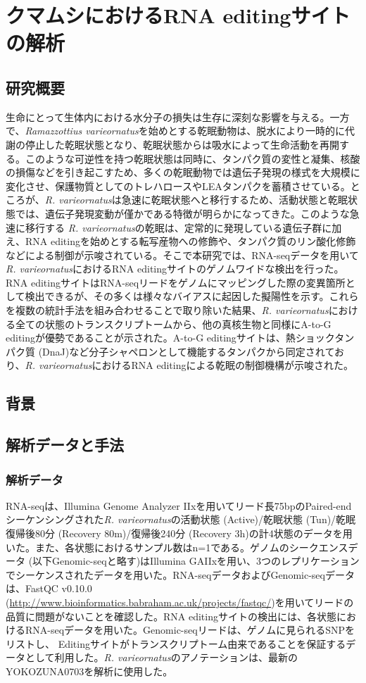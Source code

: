 \chapter{クマムシにおけるRNA editingサイトの解析}

\section{研究概要}
生命にとって生体内における水分子の損失は生存に深刻な影響を与える。一方で、{\it Ramazzottius varieornatus}を始めとする乾眠動物は、脱水により一時的に代謝の停止した乾眠状態となり、乾眠状態からは吸水によって生命活動を再開する。このような可逆性を持つ乾眠状態は同時に、タンパク質の変性と凝集、核酸の損傷などを引き起こすため、多くの乾眠動物では遺伝子発現の様式を大規模に変化させ、保護物質としてのトレハロースやLEAタンパクを蓄積させている。ところが、{\it R. varieornatus}は急速に乾眠状態へと移行するため、活動状態と乾眠状態では、遺伝子発現変動が僅かである特徴が明らかになってきた。このような急速に移行する {\it R. varieornatus}の乾眠は、定常的に発現している遺伝子群に加え、RNA editingを始めとする転写産物への修飾や、タンパク質のリン酸化修飾などによる制御が示唆されている。そこで本研究では、RNA-seqデータを用いて{\it R. varieornatus}におけるRNA editingサイトのゲノムワイドな検出を行った。RNA editingサイトはRNA-seqリードをゲノムにマッピングした際の変異箇所として検出できるが、その多くは様々なバイアスに起因した擬陽性を示す。これらを複数の統計手法を組み合わせることで取り除いた結果、{\it R. varieornatus}における全ての状態のトランスクリプトームから、他の真核生物と同様にA-to-G editingが優勢であることが示された。A-to-G editingサイトは、熱ショックタンパク質 (DnaJ)など分子シャペロンとして機能するタンパクから同定されており、{\it R. varieornatus}におけるRNA editingによる乾眠の制御機構が示唆された。

\section{背景}

\section{解析データと手法}
\subsection{解析データ}
RNA-seqは、Illumina Genome Analyzer IIxを用いてリード長75bpのPaired-endシーケンシングされた{\it R. varieornatus}の活動状態 (Active)/乾眠状態 (Tun)/乾眠復帰後80分 (Recovery 80m)/復帰後240分 (Recovery 3h)の計4状態のデータを用いた。また、各状態におけるサンプル数はn=1である。ゲノムのシークエンスデータ (以下Genomic-seqと略す)はIllumina GAIIxを用い、3つのレプリケーションでシーケンスされたデータを用いた。RNA-seqデータおよびGenomic-seqデータは、FastQC v0.10.0 (\url{http://www.bioinformatics.babraham.ac.uk/projects/fastqc/})を用いてリードの品質に問題がないことを確認した。RNA editingサイトの検出には、各状態におけるRNA-seqデータを用いた。Genomic-seqリードは、ゲノムに見られるSNPをリストし、 Editingサイトがトランスクリプトーム由来であることを保証するデータとして利用した。{\it R. varieornatus}のアノテーションは、最新のYOKOZUNA0703を解析に使用した。

